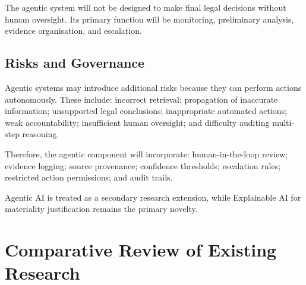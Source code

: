 The agentic system will not be designed to make final legal decisions without human oversight. Its primary function will be monitoring, preliminary analysis, evidence organisation, and escalation.

\subsection{Risks and Governance}

\label{sec:2-9-3}

Agentic systems may introduce additional risks because they can perform actions autonomously. These include: incorrect retrieval; propagation of inaccurate information; unsupported legal conclusions; inappropriate automated actions; weak accountability; insufficient human oversight; and difficulty auditing multi-step reasoning.

Therefore, the agentic component will incorporate: human-in-the-loop review; evidence logging; source provenance; confidence thresholds; escalation rules; restricted action permissions; and audit trails.

Agentic AI is treated as a secondary research extension, while Explainable AI for materiality justification remains the primary novelty.

\section{Comparative Review of Existing Research}

\label{sec:2-10}

